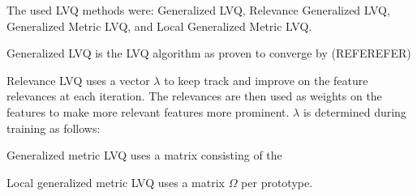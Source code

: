 
The used LVQ methods were: Generalized LVQ, Relevance Generalized LVQ, Generalized Metric LVQ, and Local Generalized Metric LVQ.

Generalized LVQ is the LVQ algorithm as proven to converge by (REFEREFER)  

Relevance LVQ uses a vector $\lambda$ to keep track and improve on the feature relevances at each iteration. The relevances are then used as weights on the features to make more relevant features more prominent. $\lambda$ is determined during training as follows:

Generalized metric LVQ uses a matrix consisting of the  

Local generalized metric LVQ uses a matrix $\Omega$ per prototype.


% 




